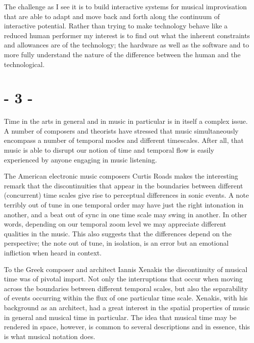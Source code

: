 \documentclass{article}
\begin{document}
The challenge as I see it is to build interactive systems for musical improvisation that are able to adapt and move back and forth along the continuum of interactive potential. %
Rather than trying to make technology behave like a reduced human performer my interest is to find out what the inherent constraints and allowances are of the technology; the hardware as well as the software and to more fully understand the nature of the difference between the human and the technological.

\section*{- 3 -}
\label{sec:-3-}

Time in the arts in general and in music in particular is in itself a complex issue.
A number of composers and theorists have stressed that music simultaneously encompass a number of temporal modes and different timescales. After all, that music is able to disrupt our notion of time and temporal flow is easily experienced by anyone engaging in music listening.

The American electronic music composers Curtis Roads makes the interesting remark that the discontinuities that appear in the boundaries between different (concurrent) time scales give rise to perceptual differences in sonic events. \citep[4]{roads}  A note terribly out of tune in one temporal order may have just the right intonation in another, and a beat out of sync in one time scale may swing in another. %
In other words, depending on our temporal zoom level we may appreciate different qualities in the music. This also suggests that the differences depend on the perspective; the note out of tune, in isolation, is an error but an emotional infliction when heard in context. 

To the Greek composer and architect Iannis Xenakis the discontinuity of musical time was of pivotal import. Not only the interruptions that occur when moving across the boundaries between different temporal scales, but also the separability of events occurring within the flux of one particular time scale. Xenakis, with his background as an architect, had a great interest in the spatial properties of music in general and musical time in particular. The idea that musical time may be rendered in space, however, is common to several descriptions and in essence, this is what musical notation does.
\end{document}
